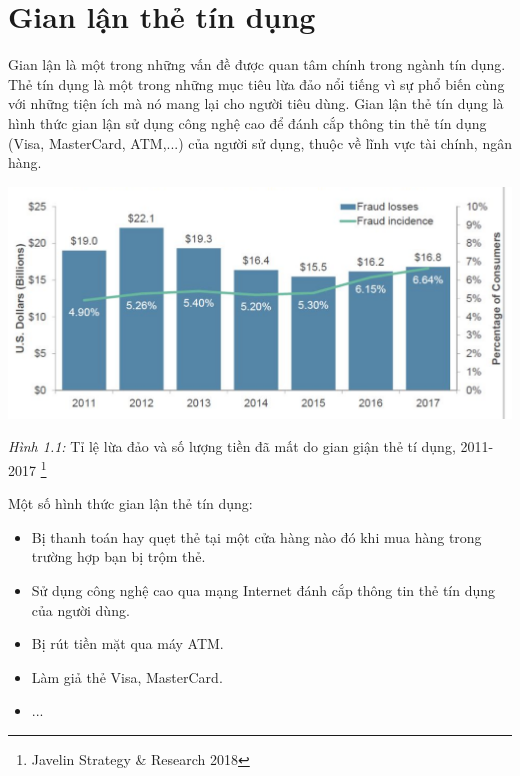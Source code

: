 \section{Gian lận thẻ tín dụng}
Gian lận là một trong những vấn đề được quan tâm chính trong ngành tín dụng. Thẻ tín dụng là một trong những mục tiêu lừa đảo nổi tiếng vì sự phổ biến cùng với những tiện ích mà nó mang lại cho người tiêu dùng. Gian lận thẻ tín dụng là hình thức gian lận sử dụng công nghệ cao để đánh cắp thông tin thẻ tín dụng (Visa, MasterCard, ATM,...) của người sử dụng, thuộc về lĩnh vực tài chính, ngân hàng. 

\begin{center}
	
	\includegraphics[scale=0.3]{11.png}
	
	
	\textit{Hình 1.1:} Tỉ lệ lừa đảo và số lượng tiền đã mất do gian giận thẻ tí dụng, 2011-2017 \footnote{Javelin Strategy \& Research 2018}
\end{center}


Một số hình thức gian lận thẻ tín dụng:
\begin{itemize}
	\item Bị thanh toán hay quẹt thẻ tại một cửa hàng nào đó khi mua hàng trong trường hợp bạn bị trộm thẻ.
	\item Sử dụng công nghệ cao qua mạng Internet đánh cắp thông tin thẻ tín dụng của người dùng.
	\item Bị rút tiền mặt qua máy ATM.
	\item Làm giả thẻ Visa, MasterCard.
	\item ...
\end{itemize}

